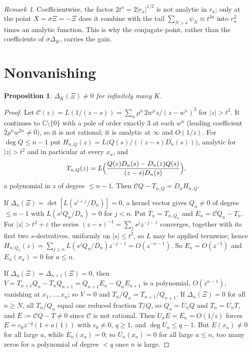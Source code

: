 \documentclass[11pt]{amsart}
\newtheorem{proposition}[theorem]{Proposition}
\theoremstyle{definition}
\theoremstyle{remark}
\newtheorem{remark}[theorem]{Remark}
\numberwithin{equation}{section}
\newcommand{\CC}{\mathbb{C}}
\newcommand{\cC}{\mathcal{C}}
\begin{document}
\begin{remark}
Coefficientwise, the factor $2t^a=2|r_a|^{1/2}$ is not analytic in $r_a$; only at the point $X=\sigma\Xi=-\Xi$ does it
combine with the tail $\sum_{N>a}\psi_N\approx t^{3a}$ into $r_a^2$ times an analytic function. This is why the
conjugate point, rather than the coefficients of $\sigma\Delta_K$, carries the gain.
\end{remark}

\section{Nonvanishing}\label{sec:nonvan}

\begin{proposition}\label{prop:nonvan}
$\Delta_K(\Xi)\ne0$ for infinitely many $K$.
\end{proposition}
\begin{proof}
Let $\cC(z)=L(1/(z-s))=\sum_n\rho^n\,2w^nz/(z-w^n)^3$ for $|z|>t^2$. It continues to $\CC\setminus\{0\}$ with a pole
of order exactly $3$ at each $w^n$ (leading coefficient $2\rho^nw^{2n}\ne0$), so it is not rational; it is analytic at
$\infty$ and $O(1/z)$. For $\deg Q\le n-1$ put $H_{n,Q}(z)=L\bigl(Q(s)/((z-s)D_n(s))\bigr)$, analytic for $|z|>t^2$
and in particular at every $x_a$, and
\[
T_{n,Q}(z)=L\Bigl(\frac{Q(z)D_n(s)-D_n(z)Q(s)}{(z-s)D_n(s)}\Bigr),
\]
a polynomial in $z$ of degree $\le n-1$. Then $\cC Q-T_{n,Q}=D_nH_{n,Q}$.

If $\Delta_n(\Xi)=\det[L(s^{i+j}/D_n)]=0$, a kernel vector gives $Q_n\ne0$ of degree $\le n-1$ with
$L(s^jQ_n/D_n)=0$ for $j<n$. Put $T_n=T_{n,Q_n}$ and $E_n=\cC Q_n-T_n$. For $|z|>t^2+\varepsilon$ the series
$(z-s)^{-1}=\sum_js^jz^{-j-1}$ converges, together with its first two $s$-derivatives, uniformly on $|s|\le t^2$, so $L$
may be applied termwise; hence $H_{n,Q_n}(z)=\sum_{j\ge n}L(s^jQ_n/D_n)z^{-j-1}=O(z^{-n-1})$. So $E_n=O(z^{-1})$ and
$E_n(x_a)=0$ for $a\le n$.

If $\Delta_n(\Xi)=\Delta_{n+1}(\Xi)=0$, then $V=T_{n+1}Q_n-T_nQ_{n+1}=Q_{n+1}E_n-Q_nE_{n+1}$ is a polynomial,
$O(z^{n-1})$, vanishing at $x_1,\dots,x_n$; so $V=0$ and $T_n/Q_n=T_{n+1}/Q_{n+1}$. If $\Delta_n(\Xi)=0$ for all
$n\ge N$, all $T_n/Q_n$ equal one reduced fraction $T/Q$, so $Q_n=U_nQ$ and $T_n=U_nT$, and $E:=\cC Q-T\ne0$ since
$\cC$ is not rational. Then $U_nE=E_n=O(1/z)$ forces $E=c_0z^{-q}(1+o(1))$ with $c_0\ne0$, $q\ge1$, and
$\deg U_n\le q-1$. But $E(x_a)\ne0$ for all large $a$, while $E_n(x_a)=0$; so $U_n(x_a)=0$ for all large $a\le n$, too
many zeros for a polynomial of degree $<q$ once $n$ is large.
\end{proof}
\end{document}
